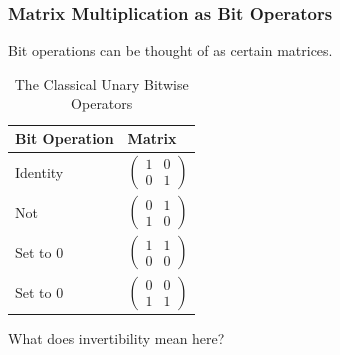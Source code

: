\documentclass{beamer}
\begin{document}
\begin{frame}
\frametitle{Matrix Multiplication as Bit Operators}
Bit operations can be thought of
as certain matrices.

\begin{table}
\begin{tabular}{l l}
\toprule
\textbf{Bit Operation} & \textbf{Matrix}\\
\midrule
Identity & $\begin{pmatrix}1 & 0 \\ 0 & 1\end{pmatrix}$ \\
Not & $\begin{pmatrix}0 & 1 \\ 1 & 0\end{pmatrix}$\\
Set to 0 & $\begin{pmatrix}1 & 1 \\ 0 & 0\end{pmatrix}$\\
Set to 0 & $\begin{pmatrix}0 & 0 \\ 1 & 1\end{pmatrix}$\\
\bottomrule
\end{tabular}
\caption{The Classical Unary Bitwise Operators}
\end{table}

What does invertibility mean here?

\end{frame}
\end{document}
